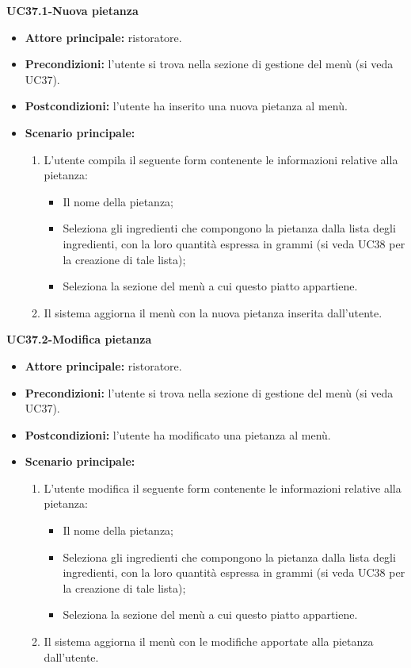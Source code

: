 \textbf{UC37.1-Nuova pietanza}  
\begin{itemize}
    \item \textbf{Attore principale:} ristoratore.
    \item \textbf{Precondizioni:} l'utente si trova nella sezione di gestione del menù (si veda UC37).
    \item \textbf{Postcondizioni:} l'utente ha inserito una nuova pietanza al menù.
    \item \textbf{Scenario principale:}
    \begin{enumerate}
        \item L'utente compila il seguente form contenente le informazioni relative alla pietanza:
        \begin{itemize}
            \item Il nome della pietanza;
            \item Seleziona gli ingredienti che compongono la pietanza dalla lista degli ingredienti, con la loro quantità espressa in grammi (si veda UC38 per la creazione di tale lista);
            \item Seleziona la sezione del menù a cui questo piatto appartiene.
        \end{itemize}
        \item Il sistema aggiorna il menù con la nuova pietanza inserita dall'utente.
    \end{enumerate}
\end{itemize}

\textbf{UC37.2-Modifica pietanza}  
\begin{itemize}
    \item \textbf{Attore principale:} ristoratore.
    \item \textbf{Precondizioni:} l'utente si trova nella sezione di gestione del menù (si veda UC37).
    \item \textbf{Postcondizioni:} l'utente ha modificato una pietanza al menù.
    \item \textbf{Scenario principale:}
    \begin{enumerate}
        \item L'utente modifica il seguente form contenente le informazioni relative alla pietanza:
        \begin{itemize}
            \item Il nome della pietanza;
            \item Seleziona gli ingredienti che compongono la pietanza dalla lista degli ingredienti, con la loro quantità espressa in grammi (si veda UC38 per la creazione di tale lista);
            \item Seleziona la sezione del menù a cui questo piatto appartiene.
        \end{itemize}
        \item Il sistema aggiorna il menù con le modifiche apportate alla pietanza dall'utente.
    \end{enumerate}
\end{itemize}

